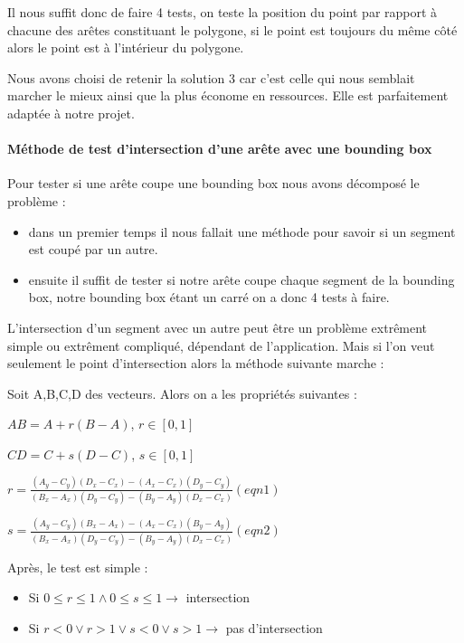 \documentclass[a4paper,12pt]{report}
\begin{document}
Il nous suffit donc de faire 4 tests, on teste la position du point par rapport à chacune des arêtes constituant le polygone, si le point est toujours du même côté alors le point est à l'intérieur du polygone.

Nous avons choisi de retenir la solution 3 car c'est celle qui nous semblait marcher le mieux ainsi que la plus économe en ressources. Elle est parfaitement adaptée à notre projet.

\paragraph{Méthode de test d'intersection d'une arête avec une bounding box }

Pour tester si une arête coupe une bounding box nous avons décomposé le problème :
\begin{itemize}
 \item dans un premier temps il nous fallait une méthode pour savoir si un segment est coupé par un autre.
 \item ensuite il suffit de tester si notre arête coupe chaque segment de la bounding box, notre bounding box étant un carré on a donc 4 tests à faire.
\end{itemize}

L'intersection d'un segment avec un autre peut être un problème extrêment simple ou extrêment compliqué, dépendant de l'application. 
Mais si l'on veut seulement le point d'intersection alors la méthode suivante marche :

Soit A,B,C,D des vecteurs. Alors on a les propriétés suivantes :

$AB=A+r(B-A)$, $r \in [0,1]$

$CD=C+s(D-C)$, $s \in [0,1]$

$r = \frac{(A_{y}-C_{y})(D_{x}-C_{x})-(A_{x}-C_{x})(D_{y}-C_{y})}{(B_{x}-A_{x})(D_{y}-C_{y})-(B_{y}-A_{y})(D_{x}-C_{x})} (eqn 1)$

$s = \frac{(A_{y}-C_{y})(B_{x}-A_{x})-(A_{x}-C_{x})(B_{y}-A_{y})}{(B_{x}-A_{x})(D_{y}-C_{y})-(B_{y}-A_{y})(D_{x}-C_{x})} (eqn 2)$

Après, le test est simple : 
\begin{itemize}
 \item Si $0\le r \le 1 \wedge 0 \le s \le 1 \rightarrow$ intersection
 \item Si $r<0 \vee r>1 \vee s<0 \vee s>1 \rightarrow$ pas d'intersection
\end{itemize}
\end{document}
